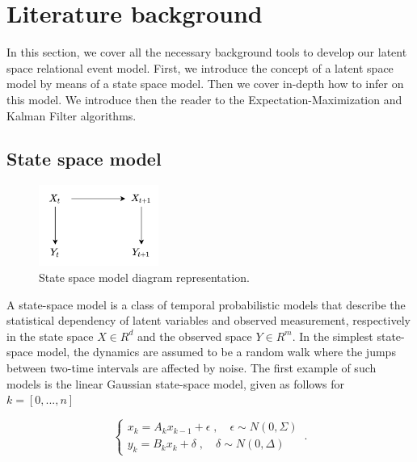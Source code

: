 \documentclass[mscthesis]{usiinfthesis}
\begin{document}
\chapter{Literature background}

In this section, we cover all the necessary background tools to develop our latent space relational event model. First, we introduce the concept of a latent space model by means of a state space model. Then we cover in-depth how to infer on this model. We introduce then the reader to the Expectation-Maximization and Kalman Filter algorithms. 

\section{State space model}
\label{sec:latent_space}

\begin{figure}[H]
    \centering
    \includegraphics[width=0.35\textwidth]{statespace_diagram.png}
    \caption{State space model diagram representation.}
    \label{fig:statespace_diagram}
\end{figure}

A state-space model is a class of temporal probabilistic models that describe the statistical dependency of latent variables and observed measurement, respectively in the state space $X \in R^d$ and the observed space $Y \in R^m$. In the simplest state-space model, the dynamics are assumed to be a random walk where the jumps between two-time intervals are affected by noise. The first example of such models is the linear Gaussian state-space model, given as follows for $k = [0, ..., n]$

\begin{eqfloat}
\begin{equation}
    \begin{cases}
      x_k = A_k x_{k-1} + \epsilon \; , \quad \epsilon \sim N(0, \Sigma) \\
      y_k = B_k x_k + \delta  \; , \quad \delta \sim N(0, \Delta) 
    \end{cases}\,.
\label{eq:statespace}
\end{equation}
\caption{State space model}
\end{eqfloat}
\end{document}
